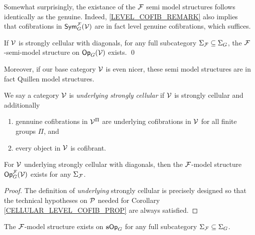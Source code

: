 \documentclass[a4paper,10pt]{article}%
\begin{document}
Somewhat surprisingly, the existance of the $\F$ semi model structures follows identically as the genuine. Indeed, \ref{LEVEL_COFIB_REMARK} also implies that cofibrations in $\Sym_G^\F(\V)$ are in fact level genuine cofibrations, which suffices.
\begin{corollary} 
  \label{OP_F_SEMI_MODEL_THM}
  If $\V$ is strongly cellular with diagonals, for any full subcategory $\Sigma_\F \subseteq \Sigma_G$, the $\F$-semi-model structure on $\Op_G(\V)$ exists. \qed
\end{corollary} 

Moreover, if our base category $\V$ is even nicer, these semi model structures are in fact Quillen model structures.

\begin{definition}
      \label{UNDERLYING_STRONGLY_CELLULAR}
      We say a category $\V$ is \textit{underlying strongly cellular} if $\V$ is strongly cellular and additionally
      \begin{enumerate}
          \item gennuine cofibrations in $\V^\Pi$ are underlying cofibrations in $\V$ for all finite groups $\Pi$, and
          \item every object in $\V$ is cofibrant.
      \end{enumerate}
\end{definition}
 
\begin{theorem} 
  \label{OP_F_Q_MODEL_THM}
  For $\V$ underlying strongly cellular with diagonals, %
  then the $\F$-model structure $\Op_G^\F(\V)$ exists for any $\Sigma_\F$.
\end{theorem} 
\begin{proof} 
  The definition of \textit{underlying} strongly cellular is precisely designed so that the technical hypotheses on $\P$ needed for Corollary \ref{CELLULAR_LEVEL_COFIB_PROP} are always satisfied. 
\end{proof} 

\begin{example} 
  The $\F$-model structure exists on $\s\Op_G$ for any full subcategory $\Sigma_\F \subseteq \Sigma_G$.
\end{example} 
\end{document}

